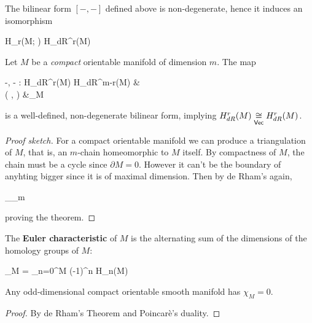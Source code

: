 \begin{theorem}[de Rham]
\label{th:de_rham}
	The bilinear form $[-,-]$ defined above is non-degenerate, hence it induces an isomorphism
	\begin{eqalign}
		H_r(M; \R) \isoin{\Vec} H_{dR}^r(M)
	\end{eqalign}
\end{theorem}

\begin{theorem}
	Let $M$ be a \emph{compact} orientable manifold of dimension $m$. The map
	\begin{eqalign}
		\langle -, - \rangle : H_{dR}^r(M) \times H_{dR}^{m-r}(M) &\longto \R\\
		( \overline \omega, \overline \eta) &\longmapsto \int_M \omega \wedge \eta
	\end{eqalign}
	is a well-defined, non-degenerate bilinear form, implying $H_{dR}^r(M) \isoin\Vec H_{dR}^r(M)$.
\end{theorem}
\begin{proof}[Proof sketch]
	For a compact orientable manifold we can produce a triangulation of $M$, that is, an $m$-chain homeomorphic to $M$ itself. By compactness of $M$, the chain must be a cycle since $\partial M = 0$. However it can't be the boundary of anyhting bigger since it is of maximal dimension. Then by de Rham's again,
	\begin{eqalign}
		\int_{\Delta_m} \omega \wedge \eta \neq 0
	\end{eqalign}
	proving the theorem.
\end{proof}

\begin{definition}
	The \textbf{Euler characteristic} of $M$ is the alternating sum of the dimensions of the homology groups of $M$:
	\begin{eqalign}
		\chi_M = \sum_{n=0}^{\dim M} (-1)^n \dim H_n(M)
	\end{eqalign}
\end{definition}

\begin{corollary}
	Any odd-dimensional compact orientable smooth manifold has $\chi_M = 0$.
\end{corollary}
\begin{proof}
	By de Rham's Theorem and Poincarè's duality.
\end{proof}

